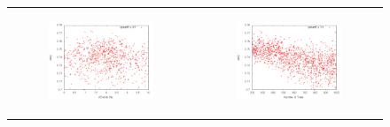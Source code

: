 \begin{figure}[!t]
\begin{tabular}[b]{cc}
  	  \begin{subfigure}[b]{0.5\linewidth}
	   	\includegraphics[width=\linewidth]{sections/parameter_optimization_bdt/nEvents.png}
 		\caption[]{}
		\label{fig:bdt_nEvents}
  	  \end{subfigure} &
  	  \begin{subfigure}[b]{0.5\linewidth}
  	  	\includegraphics[width=\linewidth]{sections/parameter_optimization_bdt/Nt.png}
 		\caption[]{}
		\label{fig:bdt_Nt}
  	  \end{subfigure} \\
  	  

\end{tabular}
\end{figure}
